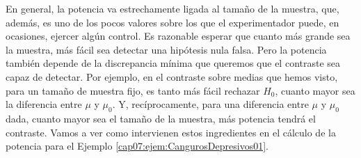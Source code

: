 En general, la potencia va estrechamente ligada al tamaño de la muestra, que, además, es uno de los pocos valores sobre los que el experimentador puede, en ocasiones, ejercer algún control. Es razonable esperar que cuanto más grande sea la muestra, más fácil sea detectar una hipótesis nula falsa. Pero la potencia también depende de la discrepancia mínima que queremos que el contraste sea capaz de detectar. Por ejemplo, en el contraste sobre medias que hemos visto, para un tamaño de muestra fijo, es tanto más fácil rechazar $H_0$, cuanto mayor sea la diferencia entre $\mu$ y $\mu_0$. Y, recíprocamente, para una diferencia entre $\mu$ y $\mu_0$ dada, cuanto mayor sea el tamaño de la muestra, más potencia tendrá el contraste. Vamos a ver como intervienen estos ingredientes en el cálculo de la potencia para el Ejemplo \ref{cap07:ejem:CangurosDepresivos01}.

